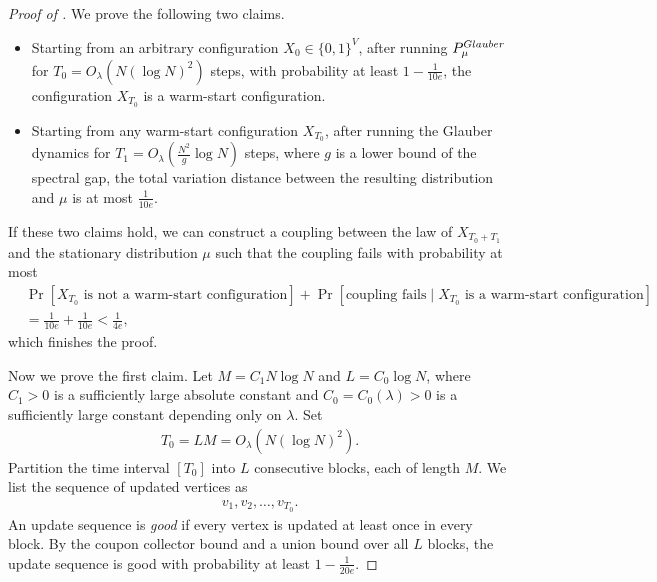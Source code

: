 \documentclass[10pt,a4paper]{amsart}
\renewcommand{\Pr}{\mathop{\mathrm{Pr}}\nolimits}
\begin{document}
\begin{proof}[Proof of ]
We prove the following two claims.
\begin{itemize}
    \item Starting from an arbitrary configuration $X_0 \in \{0,1\}^{V}$, after running $P_{\mu}^{\textnormal{Glauber}}$ for $T_0 = O_\lambda(N (\log N)^2)$ steps, with probability at least $1 - \frac{1}{10e}$, the configuration $X_{T_0}$ is a warm-start configuration.
    \item Starting from any warm-start configuration $X_{T_0}$, after running the Glauber dynamics for $T_1 = O_\lambda\left(\frac{N^2}{g} \log N\right)$ steps, where $g$ is a lower bound of the spectral gap, the total variation distance between the resulting distribution and $\mu$ is at most $\frac{1}{10e}$.
\end{itemize}
If these two claims hold, we can construct a coupling between the law of $X_{T_0 + T_1}$ and the stationary distribution $\mu$ such that the coupling fails with probability at most
\begin{align*}
&\Pr[X_{T_0} \text{ is not a warm-start configuration}] + \Pr[\text{coupling fails} \mid X_{T_0} \text{ is a warm-start configuration}] \\
&= \frac{1}{10e} + \frac{1}{10e} < \frac{1}{4e},
\end{align*}
which finishes the proof.

Now we prove the first claim. Let $M = C_1 N \log N$ and $L = C_0 \log N$, where $C_1 > 0$ is a sufficiently large absolute constant and $C_0 = C_0(\lambda) > 0$ is a sufficiently large constant depending only on $\lambda$. Set
\begin{align*}
T_0 = LM = O_\lambda(N(\log N)^2).
\end{align*}
Partition the time interval $[T_0]$ into $L$ consecutive blocks, each of length $M$.
We list the sequence of updated vertices as
\begin{align*}
  v_1,v_2,\ldots,v_{T_0}.
\end{align*}
An update sequence is \emph{good} if every vertex is updated at least once in every block.
By the coupon collector bound and a union bound over all $L$ blocks, the update sequence is good with probability at least $1 - \frac{1}{20e}$.


\end{proof}
\end{document}
